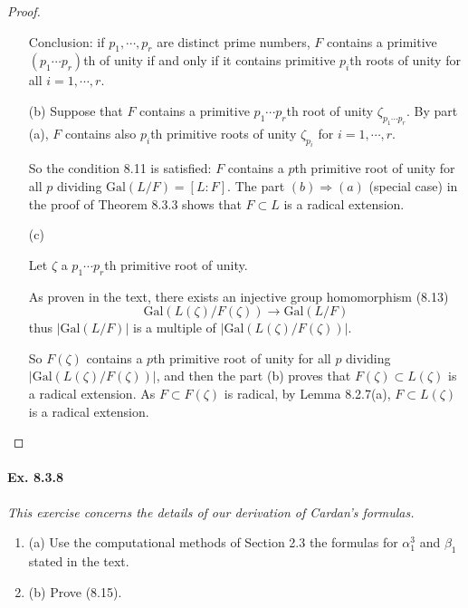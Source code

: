\documentclass[11pt,a4paper]{article}
\newcommand{\be} {\begin{enumerate}}
\newcommand{\ee} {\end{enumerate}}
\newcommand{\Gal}{\mathrm{Gal}}
\begin{document}
\begin{proof}
\begin{enumerate}
Conclusion: if $p_1,\cdots,p_r$ are distinct prime numbers, $F$ contains a primitive $(p_1\cdots p_r)$th of unity if and only if it contains primitive $p_i$th roots of unity for all $i = 1,\cdots,r$.

\item[(b)]
Suppose that $F$ contains a primitive $p_1\cdots p_r$th root of unity $\zeta_{p_1\cdots p_r}$. By part (a), $F$ contains also $p_i$th primitive roots of unity $\zeta_{p_i}$ for $ i=1,\cdots,r$. 

So the condition 8.11 is satisfied: $F$ contains a  $p$th primitive root of unity for all $p$ dividing $\Gal(L/F) = [L:F]$. The part $(b)\Rightarrow(a)$ (special case) in the proof of Theorem 8.3.3 shows that $F\subset L$ is a radical extension.

\item[(c)]

Let $\zeta$ a $p_1\cdots p_r$th primitive root of unity. 

As proven in the text, there exists an injective group homomorphism (8.13)
$$\Gal(L(\zeta)/F(\zeta)) \to\Gal(L/F)$$
thus $\vert \Gal(L/F) \vert$ is a multiple of $\vert \Gal(L(\zeta)/F(\zeta)) \vert$.

So $F(\zeta)$ contains a  $p$th primitive root of unity for all $p$ dividing $\vert \Gal(L(\zeta)/F(\zeta)) \vert$, and then the part (b) proves that  $F(\zeta)\subset L(\zeta)$ is a radical extension. As $F \subset F(\zeta)$ is radical, by Lemma 8.2.7(a), $F \subset L(\zeta)$ is a radical extension.
\end{enumerate}
\end{proof}

\paragraph{Ex. 8.3.8}

{\it This exercise concerns the details of our derivation of Cardan's formulas.
\be
\item[(a)] Use the computational methods of Section 2.3 the formulas for $\alpha_1^3$ and $\beta_1$ stated in the text.
\item[(b)] Prove (8.15).
\ee
}
\end{document}
